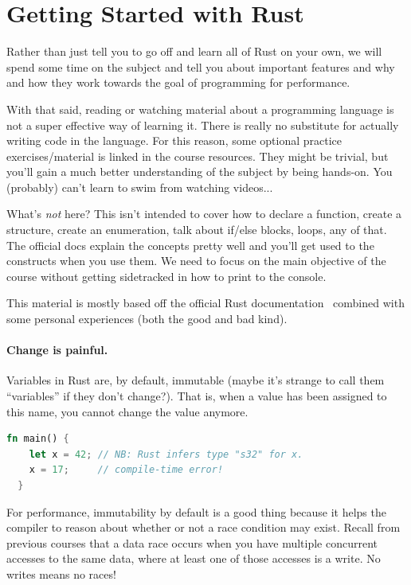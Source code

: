 




\section*{Getting Started with Rust}
Rather than just tell you to go off and learn all of Rust on your own, we will spend some time on the subject and tell you about important features and why and how they work towards the goal of programming for performance.

With that said, reading or watching material about a programming language is not a super effective way of learning it. There is really no substitute for actually writing code in the language. For this reason, some optional practice exercises/material is linked in the course resources. They might be trivial, but you'll gain a much better understanding of the subject by being hands-on. You (probably) can't learn to swim from watching videos...

What's \textit{not} here? This isn't intended to cover how to declare a function, create a structure, create an enumeration, talk about if/else blocks, loops, any of that. The official docs explain the concepts pretty well and you'll get used to the constructs when you use them. We need to focus on the main objective of the course without getting sidetracked in how to print to the console. 

This material is mostly based off the official Rust documentation~\cite{rustdocs} combined with some personal experiences (both the good and bad kind). 

\paragraph{Change is painful.}
Variables in Rust are, by default, immutable (maybe it's strange to call them ``variables'' if they don't change?). That is, when a value has been assigned to this name, you cannot change the value anymore.
\begin{lstlisting}[language=Rust]
  fn main() {
    let x = 42; // NB: Rust infers type "s32" for x.
    x = 17;     // compile-time error!
  }
\end{lstlisting}

For performance, immutability by default is a good thing because it helps the compiler to reason about whether or not a race condition may exist. Recall from previous courses that a data race occurs when you have multiple concurrent accesses to the same data, where at least one of those accesses is a write. No writes means no races! 

